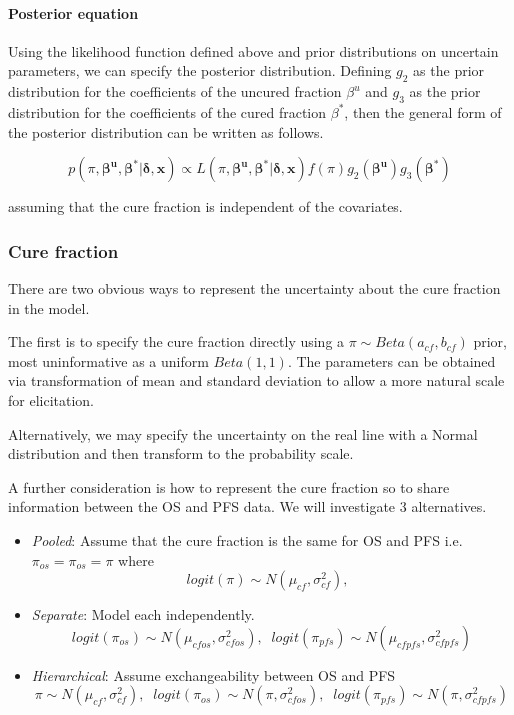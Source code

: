 \documentclass[
]{article}
\providecommand{\tightlist}{%
  \setlength{\itemsep}{0pt}\setlength{\parskip}{0pt}}
\begin{document}
\hypertarget{posterior-equation}{%
\paragraph{Posterior equation}\label{posterior-equation}}

Using the likelihood function defined above and prior distributions on
uncertain parameters, we can specify the posterior distribution.
Defining \(g_2\) as the prior distribution for the coefficients of the
uncured fraction \(\beta^u\) and \(g_3\) as the prior distribution for
the coefficients of the cured fraction \(\beta^*\), then the general
form of the posterior distribution can be written as follows.

\[
p(\pi, \boldsymbol{\beta^u}, \boldsymbol{\beta^*} | \boldsymbol{\delta}, \boldsymbol{x}) \propto
L(\pi, \boldsymbol{\beta^u}, \boldsymbol{\beta^*} | \boldsymbol{\delta}, \boldsymbol{x}) f(\pi) g_2(\boldsymbol{\beta^u}) g_3(\boldsymbol{\beta^*})
\]

assuming that the cure fraction is independent of the covariates.

\hypertarget{cure-fraction}{%
\subsubsection{Cure fraction}\label{cure-fraction}}

There are two obvious ways to represent the uncertainty about the cure
fraction in the model.

The first is to specify the cure fraction directly using a
\(\pi \sim Beta(a_{cf}, b_{cf})\) prior, most uninformative as a uniform
\(Beta(1,1)\). The parameters can be obtained via transformation of mean
and standard deviation to allow a more natural scale for elicitation.

Alternatively, we may specify the uncertainty on the real line with a
Normal distribution and then transform to the probability scale.

A further consideration is how to represent the cure fraction so to
share information between the OS and PFS data. We will investigate 3
alternatives.

\begin{itemize}
\tightlist
\item
  \emph{Pooled}: Assume that the cure fraction is the same for OS and
  PFS i.e.~\(\pi_{os} = \pi_{os} = \pi\) where \[
  logit(\pi) \sim N(\mu_{cf}, \sigma_{cf}^2), \;\;
  \]
\item
  \emph{Separate}: Model each independently. \[
  logit(\pi_{os}) \sim N(\mu_{cfos}, \sigma_{cfos}^2), \;\;  
  logit(\pi_{pfs}) \sim N(\mu_{cfpfs}, \sigma_{cfpfs}^2)  
  \]
\item
  \emph{Hierarchical}: Assume exchangeability between OS and PFS\[
  \pi \sim N(\mu_{cf}, \sigma_{cf}^2), \;\;  
  logit(\pi_{os}) \sim N(\pi, \sigma_{cfos}^2), \;\;  
  logit(\pi_{pfs}) \sim N(\pi, \sigma_{cfpfs}^2)  
  \]
\end{itemize}
\end{document}
